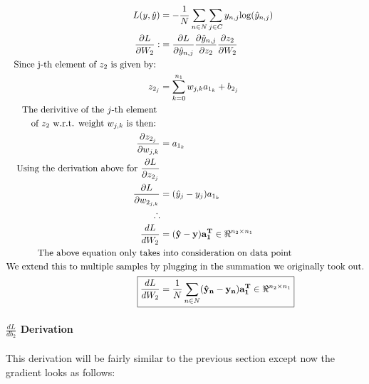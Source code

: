 \documentclass[]{article}
\begin{document}
\begin{align*}
L(y,\hat{y}) &= -  \frac{1}{N} \sum_{n \in N} \sum_{j\in C} y_{n,j} \text{log}(\hat{y}_{n,j} ) \\
\frac{\partial L}{\partial W_2} : &=  \frac{\partial L }{\partial  \hat{y}_{n,j} }      \frac{\partial  \hat{y}_{n,j} }{\partial z_2} \frac{\partial z_2}{\partial W_2}\\
\text{Since j-th element of $z_2$ is given by: } \\
z_{2_j} &= \sum_{k = 0}^{n_1}w_{j,k}a_{1_k} + b_{2_j}\\ 
\text{The derivitive of the $j$-th element }\\
\text{of $z_2$ w.r.t. weight $w_{j,k}$ is then: }\\
\frac{\partial z_{2_j}}{\partial w_{j,k}} &= a_{1_k}\\
\text{Using the derivation above for  $\frac{\partial L}{\partial z_{2_j}}$}\\
\frac{\partial L}{\partial w_{2_{j,k}}} &=  (\hat{y}_j - y_j )a_{1_k} \\
\therefore \\
\frac{dL}{dW_2} &= (\mathbf{\hat{y} - y})\mathbf{a_1^T} \in  \Re^{n_2 \times n_1} \\\text{The above equation only takes} & \text{ into consideration on data point} \\
\text{We extend this to multiple samples by} & \text{ plugging in the summation we originally took out.}\\
\Aboxed{ \frac{dL}{dW_2} &= \frac{1}{N} \sum_{n \in N} (\mathbf{\hat{y}_n - y_n})\mathbf{a_1^T} \in  \Re^{n_2 \times n_1}}\\
\end{align*}

\paragraph{$\frac{dL}{db_2}$ Derivation}
This derivation will be fairly similar to the previous section except now the gradient looks as follows:
\end{document}
